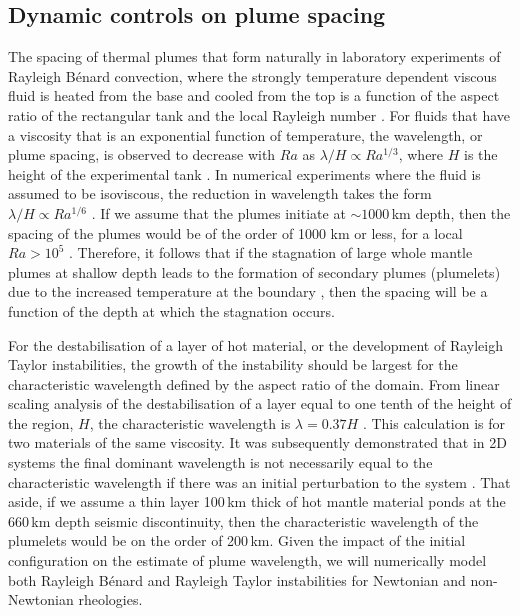 \documentclass[a4paper,10pt,twocolumn]{paper}
\begin{document}
\subsection{Dynamic controls on plume spacing}

The spacing of thermal plumes that form naturally in laboratory experiments of Rayleigh B{\'e}nard convection, where the strongly temperature dependent viscous fluid is heated from the base and cooled from the top is a function of the aspect ratio of the rectangular tank and the local Rayleigh number \citep{androvandi-etal-2011}. For fluids that have a viscosity that is an exponential function of temperature, the wavelength, or plume spacing, is observed to decrease with $Ra$ as $\lambda/H \propto Ra^{1/3}$, where $H$ is the height of the experimental tank \citep{androvandi-etal-2011}. In numerical experiments where the fluid is assumed to be isoviscous, the reduction in wavelength takes the form $\lambda/H \propto Ra^{1/6}$ \citep{zhong-2005,galsa-2007}. If we assume that the plumes initiate at $\sim 1000$\,km depth, then the spacing of the plumes would be of the order of 1000 km or less, for a local $Ra > 10^{5}$ \citep{androvandi-etal-2011}. Therefore, it follows that if the stagnation of large whole mantle plumes at shallow depth leads to the formation of secondary plumes (plumelets) due to the increased temperature at the boundary \citep[e.g.][]{kumagai-etal-2007}, then the spacing will be a function of the depth at which the stagnation occurs.

For the destabilisation of a layer of hot material, or the development of Rayleigh Taylor instabilities, the growth of the instability should be largest for the characteristic wavelength defined by the aspect ratio of the domain. From linear scaling analysis of the destabilisation of a layer equal to one tenth of the height of the region, $H$, the characteristic wavelength is $\lambda = 0.37H$ \citep{schmeling-1987}. This calculation is for two materials of the same viscosity. It was subsequently demonstrated that in 2D systems the final dominant wavelength is not necessarily equal to the characteristic wavelength if there was an initial perturbation to the system \citep{schmeling-1987}. That aside, if we assume a thin layer 100\,km thick of hot mantle material ponds at the 660\,km depth seismic discontinuity, then the characteristic wavelength of the plumelets would be on the order of 200\,km. Given the impact of the initial configuration on the estimate of plume wavelength, we will numerically model both Rayleigh B{\'e}nard and Rayleigh Taylor instabilities for Newtonian and non-Newtonian rheologies.
\end{document}

